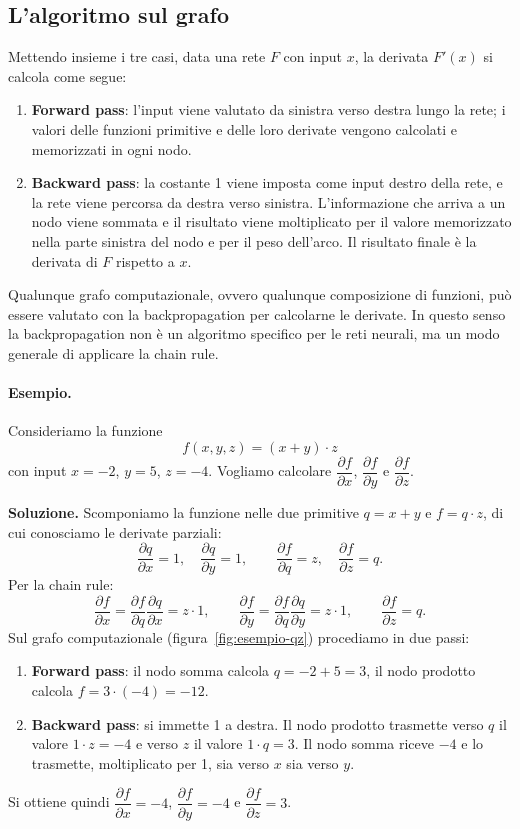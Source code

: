 \subsection{L'algoritmo sul grafo}
Mettendo insieme i tre casi, data una rete $F$ con input $x$, la derivata $F'(x)$ si calcola come segue:
\begin{enumerate}
    \item \textbf{Forward pass}: l'input viene valutato da sinistra verso destra lungo la rete; i valori delle funzioni primitive e delle loro derivate vengono calcolati e memorizzati in ogni nodo.
    \item \textbf{Backward pass}: la costante 1 viene imposta come input destro della rete, e la rete viene percorsa da destra verso sinistra. L'informazione che arriva a un nodo viene sommata e il risultato viene moltiplicato per il valore memorizzato nella parte sinistra del nodo e per il peso dell'arco. Il risultato finale è la derivata di $F$ rispetto a $x$.
\end{enumerate}

\begin{osservazione}
Qualunque grafo computazionale, ovvero qualunque composizione di funzioni, può essere valutato con la backpropagation per calcolarne le derivate. In questo senso la backpropagation non è un algoritmo specifico per le reti neurali, ma un modo generale di applicare la chain rule.
\end{osservazione}

\paragraph{Esempio.}
Consideriamo la funzione
\[
f(x, y, z) = (x + y)\cdot z
\]
con input $x = -2$, $y = 5$, $z = -4$. Vogliamo calcolare $\dfrac{\partial f}{\partial x}$, $\dfrac{\partial f}{\partial y}$ e $\dfrac{\partial f}{\partial z}$.

\textbf{Soluzione.} Scomponiamo la funzione nelle due primitive $q = x + y$ e $f = q\cdot z$, di cui conosciamo le derivate parziali:
\[
\frac{\partial q}{\partial x} = 1, \quad \frac{\partial q}{\partial y} = 1, \qquad \frac{\partial f}{\partial q} = z, \quad \frac{\partial f}{\partial z} = q.
\]
Per la chain rule:
\[
\frac{\partial f}{\partial x} = \frac{\partial f}{\partial q}\frac{\partial q}{\partial x} = z\cdot 1, \qquad
\frac{\partial f}{\partial y} = \frac{\partial f}{\partial q}\frac{\partial q}{\partial y} = z\cdot 1, \qquad
\frac{\partial f}{\partial z} = q.
\]
Sul grafo computazionale (figura~\ref{fig:esempio-qz}) procediamo in due passi:
\begin{enumerate}
    \item \textbf{Forward pass}: il nodo somma calcola $q = -2 + 5 = 3$, il nodo prodotto calcola $f = 3\cdot(-4) = -12$.
    \item \textbf{Backward pass}: si immette 1 a destra. Il nodo prodotto trasmette verso $q$ il valore $1\cdot z = -4$ e verso $z$ il valore $1\cdot q = 3$. Il nodo somma riceve $-4$ e lo trasmette, moltiplicato per 1, sia verso $x$ sia verso $y$.
\end{enumerate}
Si ottiene quindi $\dfrac{\partial f}{\partial x} = -4$, $\dfrac{\partial f}{\partial y} = -4$ e $\dfrac{\partial f}{\partial z} = 3$.

